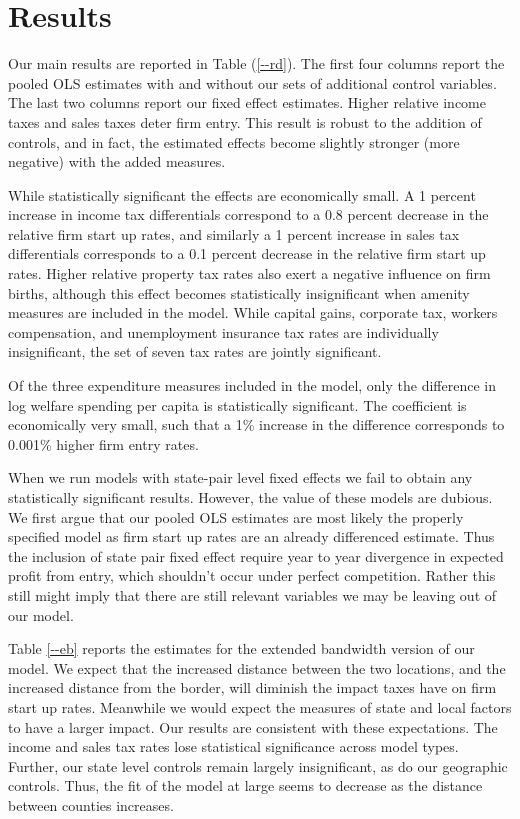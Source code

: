 \section{Results}

Our main results are reported in Table (\ref{--rd}). The first four columns report the pooled OLS estimates with and without our sets of additional control variables. The last two columns report our fixed effect estimates. Higher relative income taxes and sales taxes deter firm entry.  This result is robust to the addition of controls, and in fact, the estimated effects become slightly stronger (more negative) with the added measures.  

While statistically significant the effects are economically small.  A 1 percent increase in income tax differentials correspond to a 0.8 percent decrease in the relative firm start up rates, and similarly a 1 percent increase in sales tax differentials corresponds to a 0.1 percent decrease in the relative firm start up rates.  Higher relative property tax rates also exert a negative influence on firm births, although this effect becomes statistically insignificant when amenity measures are included in the model. While capital gains, corporate tax, workers compensation, and unemployment insurance tax rates are individually insignificant, the set of seven tax rates are jointly  significant. 

Of the three expenditure measures included in the model, only the difference in log welfare spending per capita is statistically significant. The coefficient is economically very small, such that a 1\% increase in the difference corresponds to 0.001\% higher firm entry rates.

When we run models with state-pair level fixed effects we fail to obtain any statistically significant results. However, the value of these models are dubious. We first argue that our pooled OLS estimates are most likely the properly specified model as firm start up rates are an already differenced estimate. Thus the inclusion of state pair fixed effect require year to year divergence in expected profit from entry, which shouldn’t occur under perfect competition. Rather this still might imply that there are still relevant variables we may be leaving out of our model.

Table \ref{--eb} reports the estimates for the extended bandwidth version of our model. We expect that the increased distance between the two locations, and the increased distance from the border, will diminish the impact taxes have on firm start up rates.  Meanwhile we would expect the  measures of state and local factors to have a larger impact.  Our results are consistent with these expectations. The income and sales tax rates lose statistical significance across model types. Further, our state level controls remain largely insignificant, as do our geographic controls. Thus, the fit of the model at large seems to decrease as the distance between counties increases. 

